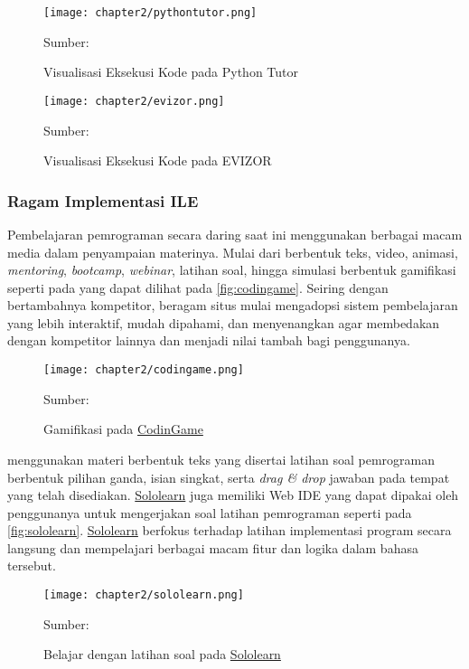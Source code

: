 \begin{figure}[!h]
  \centering
  \texttt{[image: chapter2/pythontutor.png]}
  \caption{Visualisasi Eksekusi Kode pada Python Tutor} \label{fig:pythontutor}
  Sumber: \textcite{guo2013pythontutor}
\end{figure}

\begin{figure}[!h]
  \centering
  \texttt{[image: chapter2/evizor.png]}
  \caption{Visualisasi Eksekusi Kode pada EVIZOR} \label{fig:evizor}
  Sumber: \textcite{moons2013pilot}
\end{figure}

\subsubsection{Ragam Implementasi ILE} \label{sssec:ragam-implementasi-ile}
Pembelajaran pemrograman secara daring saat ini menggunakan berbagai macam media dalam penyampaian materinya. Mulai dari berbentuk teks, video, animasi, \textit{mentoring}, \textit{bootcamp}, \textit{webinar}, latihan soal, hingga simulasi berbentuk gamifikasi seperti pada \textcite{codingame2021media} yang dapat dilihat pada \autoref{fig:codingame}. Seiring dengan bertambahnya kompetitor, beragam situs mulai mengadopsi sistem pembelajaran yang lebih interaktif, mudah dipahami, dan menyenangkan agar membedakan dengan kompetitor lainnya dan menjadi nilai tambah bagi penggunanya.

\begin{figure}[!h]
  \centering
  \texttt{[image: chapter2/codingame.png]}
  \caption{\label{fig:codingame}Gamifikasi pada \href{https://www.codingame.com}{CodinGame}}
  Sumber: \textcite{codingame2021media}
\end{figure}

\textcite{sololearn2021media} menggunakan materi berbentuk teks yang disertai latihan soal pemrograman berbentuk pilihan ganda, isian singkat, serta \textit{drag \& drop} jawaban pada tempat yang telah disediakan. \href{https://www.sololearn.com}{Sololearn} juga memiliki Web IDE yang dapat dipakai oleh penggunanya untuk mengerjakan soal latihan pemrograman seperti pada \autoref{fig:sololearn}. \href{https://www.sololearn.com}{Sololearn} berfokus terhadap latihan implementasi program secara langsung dan mempelajari berbagai macam fitur dan logika dalam bahasa tersebut.

\begin{figure}[!h]
  \centering
  \texttt{[image: chapter2/sololearn.png]}
  \caption{\label{fig:sololearn}Belajar dengan latihan soal pada \href{https://www.sololearn.com}{Sololearn}}
  Sumber: \textcite{sololearn2021media}
\end{figure}

